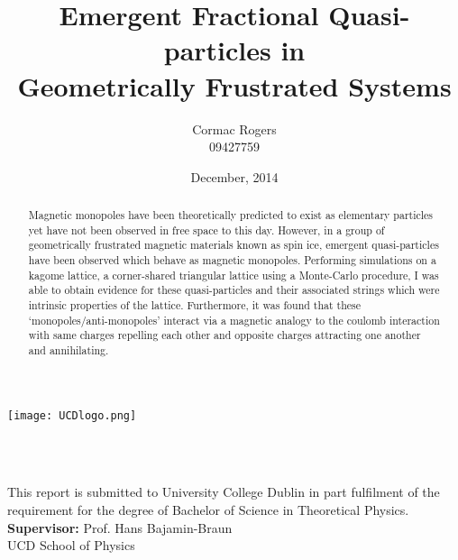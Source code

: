 \title{Emergent Fractional Quasi-particles in \\ Geometrically Frustrated Systems}
\author{Cormac Rogers\\09427759}
\date{December, 2014}

\begin{titlingpage}
    \begin{center}
        \texttt{[image: UCDlogo.png]}\\
        \vspace{1.5cm}
        \begin{LARGE}
            \textbf{\thetitle}\\
        \end{LARGE}
        \vspace{1.5cm}
        \theauthor\\
        \vspace{1.5cm}
        This report is submitted to University College Dublin in part fulfilment of the requirement for the degree of Bachelor of Science in Theoretical Physics.\\
        \vspace{1.5cm}
        \textbf{Supervisor:} Prof. Hans Bajamin-Braun\\UCD School of Physics\\
        \vspace{1.5cm}
        \thedate
        \begin{abstract}
            \noindent Magnetic monopoles have been theoretically predicted to exist as elementary particles yet have not been observed in free space to this day. However, in a group of geometrically frustrated magnetic materials known as spin ice, emergent quasi-particles have been observed which behave as magnetic monopoles. Performing simulations on a kagome lattice, a corner-shared triangular lattice using a Monte-Carlo procedure, I was able to obtain evidence for these quasi-particles and their associated strings which were intrinsic properties of the lattice. Furthermore, it was found that these `monopoles/anti-monopoles' interact via a magnetic analogy to the coulomb interaction with same charges repelling each other and opposite charges attracting one another and annihilating.
        \end{abstract}
    \end{center}
\end{titlingpage}
